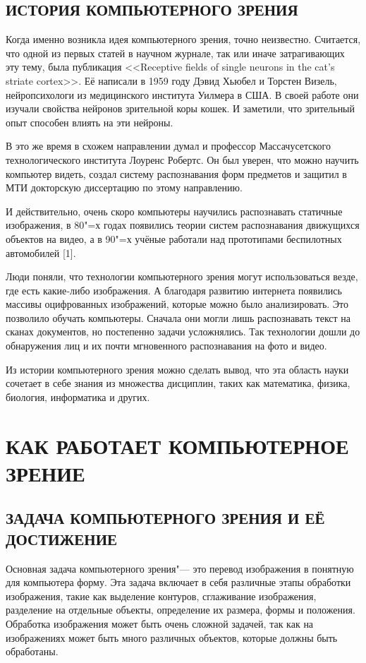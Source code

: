 \documentclass[bachelor, och, referat, times]{SCWorks}
\begin{document}
\subsection{ИСТОРИЯ КОМПЬЮТЕРНОГО ЗРЕНИЯ}
Когда именно возникла идея компьютерного зрения, точно неизвестно. Считается, что одной из первых статей в научном журнале, так или иначе затрагивающих эту тему, была публикация <<Receptive fields of single neurons in the cat’s striate cortex>>. Её написали в 1959 году Дэвид Хьюбел и Торстен Визель, нейропсихологи из медицинского института Уилмера в США. В своей работе они изучали свойства нейронов зрительной коры кошек. И заметили, что зрительный опыт способен влиять на эти нейроны. 

В это же время в схожем направлении думал и профессор Массачусетского технологического института Лоуренс Робертс. Он был уверен, что можно научить компьютер видеть, создал систему распознавания форм предметов и защитил в МТИ докторскую диссертацию по этому направлению.

И действительно, очень скоро компьютеры научились распознавать статичные изображения, в 80"=х годах появились теории систем распознавания движущихся объектов на видео, а в 90"=х учёные работали над прототипами беспилотных автомобилей [1].

Люди поняли, что технологии компьютерного зрения могут использоваться везде, где есть какие‑либо изображения. А благодаря развитию интернета появились массивы оцифрованных изображений, которые можно было анализировать. Это позволило обучать компьютеры. Сначала они могли лишь распознавать текст на сканах документов, но постепенно задачи усложнялись. Так технологии дошли до обнаружения лиц и их почти мгновенного распознавания на фото и видео.  

Из истории компьютерного зрения можно сделать вывод, что эта область науки сочетает в себе знания из множества дисциплин, таких как математика, физика, биология, информатика и других. 

\section{КАК РАБОТАЕТ КОМПЬЮТЕРНОЕ ЗРЕНИЕ}
\subsection{ЗАДАЧА КОМПЬЮТЕРНОГО ЗРЕНИЯ И ЕЁ ДОСТИЖЕНИЕ}
Основная задача компьютерного зрения"--- это перевод изображения в понятную для компьютера форму. Эта задача включает в себя различные этапы обработки изображения, такие как выделение контуров, сглаживание изображения, разделение на отдельные объекты, определение их размера, формы и положения. Обработка изображения может быть очень сложной задачей, так как на изображениях может быть много различных объектов, которые должны быть обработаны.
\end{document}
